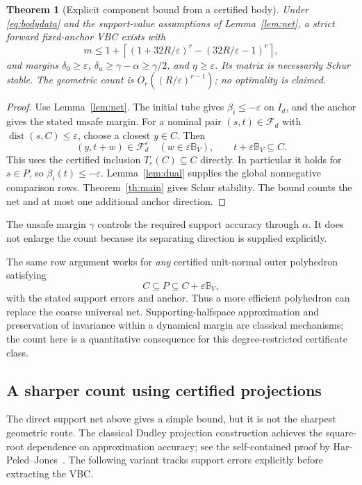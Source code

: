 \documentclass[10pt,letterpaper]{article}
\newtheorem{theorem}{Theorem}
\theoremstyle{remark}
\newcommand{\dist}{\operatorname{dist}}
\newcommand{\ball}{\mathbb B_V}
\newcommand{\F}{\mathcal F_d}
\begin{document}
\begin{theorem}[Explicit component bound from a certified body]\label{th:count}
Under \eqref{eq:bodydata} and the support-value assumptions of Lemma~\ref{lem:net}, a strict forward fixed-anchor VBC exists with
\begin{equation}\label{eq:mcount}
 m\leq 1+\left\lceil
 (1+32R/\varepsilon)^r-(32R/\varepsilon-1)^r
 \right\rceil,
\end{equation}
and margins $\delta_0\geq\varepsilon$, $\delta_u\geq\gamma-\alpha\geq\gamma/2$, and $\eta\geq\varepsilon$. Its matrix is necessarily Schur stable. The geometric count is $O_r((R/\varepsilon)^{r-1})$; no optimality is claimed.
\end{theorem}
\begin{proof}
Use Lemma~\ref{lem:net}. The initial tube gives $\beta_i\leq-\varepsilon$ on $I_d$, and the anchor gives the stated unsafe margin. For a nominal pair $(s,t)\in\F$ with $\dist(s,C)\leq\varepsilon$, choose a closest $y\in C$. Then
\[
 (y,t+w)\in\mathcal F_d^\varepsilon\quad(w\in\varepsilon\ball),
 \qquad t+\varepsilon\ball\subseteq C.
\]
This uses the certified inclusion $T_\varepsilon(C)\subseteq C$ directly. In particular it holds for $s\in P$, so $\beta_i(t)\leq-\varepsilon$. Lemma~\ref{lem:dual} supplies the global nonnegative comparison rows. Theorem~\ref{th:main} gives Schur stability. The bound counts the net and at most one additional anchor direction.
\end{proof}
The unsafe margin $\gamma$ controls the required support accuracy through $\alpha$. It does not enlarge the count because its separating direction is supplied explicitly.

The same row argument works for \emph{any} certified unit-normal outer polyhedron satisfying
\begin{equation}\label{eq:otherpoly}
 C\subseteq P\subseteq C+\varepsilon\ball,
\end{equation}
with the stated support errors and anchor. Thus a more efficient polyhedron can replace the coarse universal net. Supporting-halfspace approximation and preservation of invariance within a dynamical margin are classical mechanisms; the count here is a quantitative consequence for this degree-restricted certificate class.

\subsection{A sharper count using certified projections}
The direct support net above gives a simple bound, but it is not the sharpest geometric route. The classical Dudley projection construction achieves the square-root dependence on approximation accuracy; see the self-contained proof by Har-Peled--Jones~\cite{harpeled}. The following variant tracks support errors explicitly before extracting the VBC.
\end{document}
